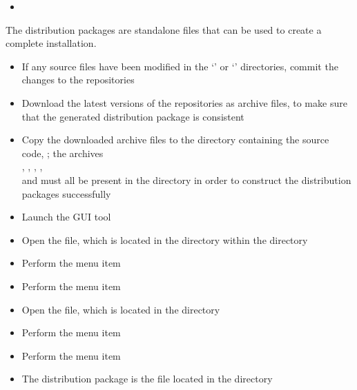 \tertiaryEnd
{}
\begin{itemize}
\item\TBD
\end{itemize}
\tertiaryEnd
\secondaryEnd
{}
The distribution packages are standalone files that can be used to create a complete
\mplusm{} installation.
\begin{itemize}
\item If any source files have been modified in the `' or
`' directories, commit the changes to the
 repositories
\item\exSp{}Download the latest versions of the  repositories as 
archive files, to make sure that the generated distribution package is consistent
\item\exSp{}Copy the downloaded  archive files to the directory containing
the \mplusm{} source code, ; the archives\\
, ,
, ,\\
 and  must
all be present in the  directory in order to construct the
distribution packages successfully
\item\exSp{}Launch the  GUI tool
\item\exSp{}Open the  file, which is located in the
 directory within the 
directory
\item\exSp{}Perform the menu item 
\item\exSp{}Perform the menu item 
\item\exSp{}Open the  file, which is located in the
 directory
\item\exSp{}Perform the menu item 
\item\exSp{}Perform the menu item 
\item\exSp{}The distribution package is the  file located in the
 directory
\end{itemize}

